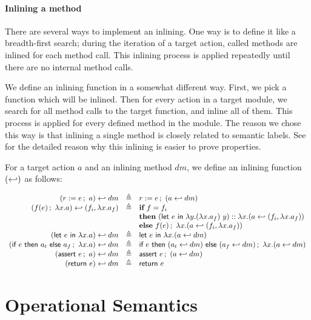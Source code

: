\paragraph{Inlining a method}
There are several ways to implement an inlining. One way is to define
it like a breadth-first search; during the iteration of a target
action, called methods are inlined for each method call. This inlining
process is applied repeatedly until there are no internal method
calls.

We define an inlining function in a somewhat different way. First, we
pick a function which will be inlined. Then for every action in a
target module, we search for all method calls to the target function,
and inline all of them. This process is applied for every defined
method in the module. The reason we chose this way is that inlining a
single method is closely related to semantic labels. See
 for the detailed reason why this inlining is easier to
prove properties.

For a target action $a$ and an inlining method $dm$, we define an
inlining function $(\inlinedmsymb)$ as follows:

\begin{definition}
  \label{def-inlinedm}
  \mbox{}
  \begin{center}
    \begin{math}
      \begin{array}{rcl}
        \inlinedm{(\actwrite{r}{e}{a})}{dm} & \triangleq &
        \actwrite{r}{e}{(\inlinedm{a}{dm})} \\
        \inlinedm{(\actcall{x}{f}{e}{a})}{(f_i, \lambda x.a_f)} & \triangleq &
        \pgmif{} f = f_i \\
        & & \pgmthen{} \concataction{(\actlet{e}{y}{(\lambda x.a_f)\ y})}{(\inlinedm{a}{(f_i, \lambda x.a_f)})} \\
        & & \pgmelse{} \actcall{x}{f}{e}{(\inlinedm{a}{(f_i, \lambda x.a_f)})} \\
        \inlinedm{(\actlet{e}{x}{a})}{dm} & \triangleq &
        \actlet{e}{x}{(\inlinedm{a}{dm})} \\
        \inlinedm{(\actifelse{e}{a_t}{a_f}{x}{a})}{dm} & \triangleq &
        \actifelse{e}{(\inlinedm{a_t}{dm})}{(\inlinedm{a_f}{dm})}{x}{(\inlinedm{a}{dm})} \\
        \inlinedm{(\actassert{e}{a})}{dm} & \triangleq &
        \actassert{e}{(\inlinedm{a}{dm})} \\
        \inlinedm{(\actret{e})}{dm} & \triangleq & \actret{e} \\
      \end{array}
    \end{math}
  \end{center}
\end{definition}

\section{Operational Semantics}

